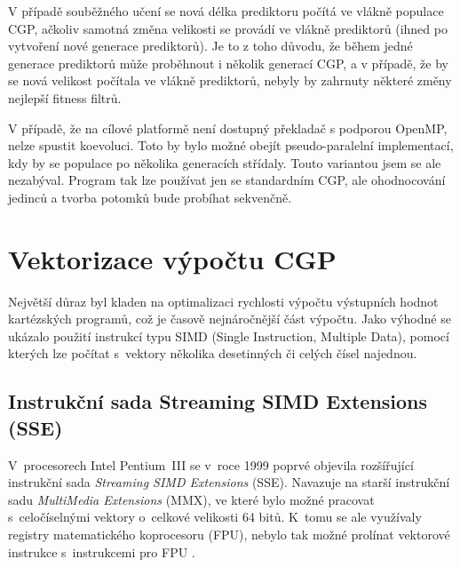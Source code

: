V případě souběžného učení se nová délka prediktoru počítá ve vlákně populace CGP, ačkoliv samotná změna velikosti se provádí ve vlákně prediktorů (ihned po vytvoření nové generace prediktorů). Je to z toho důvodu, že během jedné generace prediktorů může proběhnout i několik generací CGP, a v případě, že by se nová velikost počítala ve vlákně prediktorů, nebyly by zahrnuty některé změny nejlepší fitness filtrů.

V případě, že na cílové platformě není dostupný překladač s podporou OpenMP, nelze spustit koevoluci. Toto by bylo možné obejít pseudo-paralelní implementací, kdy by se populace po několika generacích střídaly. Touto variantou jsem se ale nezabýval. Program tak lze používat jen se standardním CGP, ale ohodnocování jedinců a tvorba potomků bude probíhat sekvenčně.


\section{Vektorizace výpočtu CGP}
\label{secImplVectorization}

Největší důraz byl kladen na optimalizaci rychlosti výpočtu výstupních hodnot kartézských programů, což je časově nejnáročnější část výpočtu. Jako výhodné se ukázalo použití  instrukcí typu SIMD (Single Instruction, Multiple Data), pomocí kterých lze počítat s~vektory několika desetinných či celých čísel najednou.


\subsection{Instrukční sada Streaming SIMD Extensions (SSE)}

V~procesorech Intel Pentium~III se v~roce 1999 poprvé objevila rozšířující instrukční sada \emph{Streaming SIMD Extensions} (SSE). Navazuje na starší instrukční sadu \emph{MultiMedia Extensions} (MMX), ve které bylo možné pracovat s~celočíselnými vektory o~celkové velikosti 64 bitů. K~tomu se ale využívaly registry matematického koprocesoru (FPU), nebylo tak možné prolínat vektorové instrukce s~instrukcemi pro FPU \cite{IntelMMX}.

